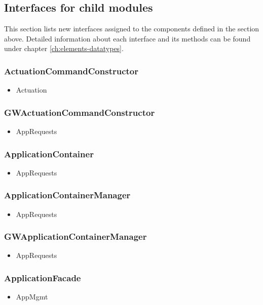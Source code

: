 \subsection{Interfaces for child modules}
    This section lists new interfaces assigned to the components defined
    in the section above. Detailed information about each interface and
    its methods can be found under chapter \ref{ch:elements-datatypes}. \\

    \subsubsection{ActuationCommandConstructor}
        \begin{itemize}
            \item Actuation
        \end{itemize}
    \subsubsection{GWActuationCommandConstructor}
        \begin{itemize}
            \item AppRequests
        \end{itemize}
   \subsubsection{ApplicationContainer}
        \begin{itemize}
            \item AppRequests
        \end{itemize}
    \subsubsection{ApplicationContainerManager}
        \begin{itemize}
            \item AppRequests
        \end{itemize}
    \subsubsection{GWApplicationContainerManager}
        \begin{itemize}
            \item AppRequests
        \end{itemize}
    \subsubsection{ApplicationFacade}
        \begin{itemize}
            \item AppMgmt
        \end{itemize}
